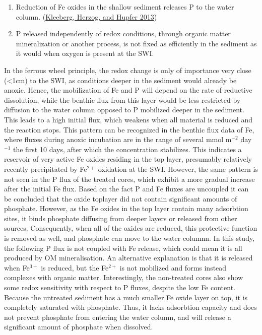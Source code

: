 \documentclass[a4paper,11pt]{article}
\begin{document}
\begin{enumerate}
\def\labelenumi{\arabic{enumi}.}
\item
  Reduction of Fe oxides in the shallow sediment releases P to the water column. (\protect\hyperlink{ref-kleebergRedoxSensitivityIron2013}{Kleeberg, Herzog, and Hupfer 2013})
\item
  P released independently of redox conditions, through organic matter mineralization or another process, is not fixed as efficiently in the sediment as it would when oxygen is present at the SWI.
\end{enumerate}
In the ferrous wheel principle, the redox change is only of importance very close (\textless1cm) to the SWI, as conditions deeper in the sediment would already be anoxic. Hence, the mobilization of Fe and P will depend on the rate of reductive dissolution, while the benthic flux from this layer would be less restricted by diffusion to the water column opposed to P mobilized deeper in the sediment. This leads to a high initial flux, which weakens when all material is reduced and the reaction stops. This pattern can be recognized in the benthic flux data of Fe, where fluxes during anoxic incubation are in the range of several mmol m\(^{-2}\) day\(^{-1}\) the first 10 days, after which the concentration stabilizes. This indicates a reservoir of very active Fe oxides residing in the top layer, presumably relatively recently precipitated by Fe\(^{2+}\) oxidation at the SWI. However, the same pattern is not seen in the P flux of the treated cores, which exhibit a more gradual increase after the initial Fe flux. Based on the fact P and Fe fluxes are uncoupled it can be concluded that the oxide toplayer did not contain significant amounts of phosphate. However, as the Fe oxides in the top layer contain many adsorbtion sites, it binds phosphate diffusing from deeper layers or released from other sources. Consequently, when all of the oxides are reduced, this protective function is removed as well, and phosphate can move to the water columnn. In this study, the following P flux is not coupled with Fe release, which could mean it is all produced by OM mineralisation. An alternative explanation is that it is released when Fe\(^{3+}\) is reduced, but the Fe\(^{2+}\) is not mobilized and forms instead complexes with organic matter. Interestingly, the non-treated cores also show some redox sensitivity with respect to P fluxes, despite the low Fe content. Because the untreated sediment has a much smaller Fe oxide layer on top, it is completely saturated with phosphate. Thus, it lacks adsorbtion capacity and does not prevent phosphate from entering the water column, and will release a significant amount of phosphate when dissolved.
\end{document}
